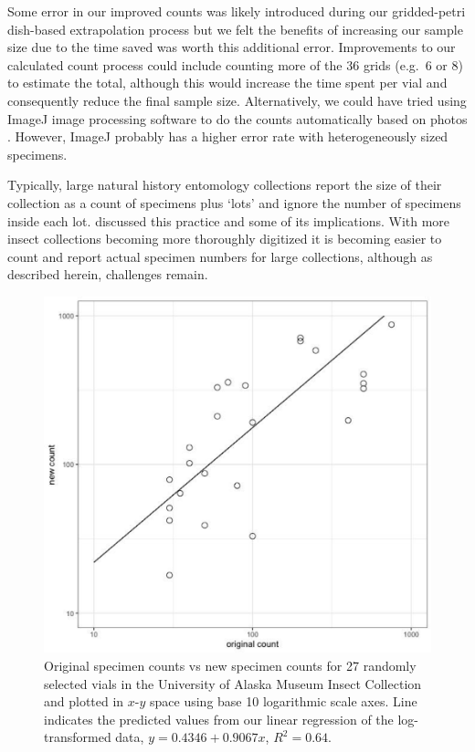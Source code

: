 \begin{multicols}{2}
Some error in our improved counts was likely introduced during our gridded-petri dish-based extrapolation process but we felt the benefits of increasing our sample size due to the time saved was worth this additional error. Improvements to our calculated count process could include counting more of the 36 grids (e.g.\ 6 or 8) to estimate the total, although this would increase the time spent per vial and consequently reduce the final sample size. Alternatively, we could have tried using ImageJ image processing software to do the counts automatically based on photos \citep{Parkeretal2020}. However, ImageJ probably has a higher error rate with heterogeneously sized specimens.

Typically, large natural history entomology collections report the size of their collection as a count of specimens plus ‘lots’ and ignore the number of specimens inside each lot. \citet{Sikes2015} discussed this practice and some of its implications. With more insect collections becoming more thoroughly digitized it is becoming easier to count and report actual specimen numbers for large collections, although as described herein, challenges remain.

\end{multicols}
\begin{figure}[H]
\begin{center}
\includegraphics[width=15cm]{img/specimen_count.png}
\caption{Original specimen counts vs new specimen counts for 27 randomly selected vials in the University of Alaska Museum Insect Collection and plotted in $x$-$y$ space using base 10 logarithmic scale axes. Line indicates the predicted values from our linear regression of the log-transformed data, $y = 0.4346 + 0.9067x$, $R^2 = 0.64$.}
\label{specimen_count_graph}
\end{center}
\end{figure} 
